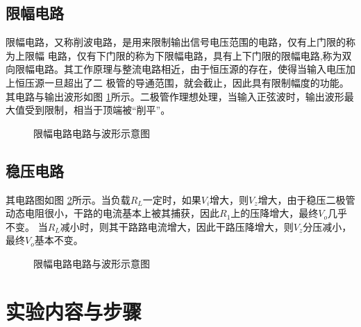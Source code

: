 \documentclass[a4paper,11pt,UTF8]{ctexart}
\begin{document}
	\subsection{限幅电路}
	限幅电路，又称削波电路，是用来限制输出信号电压范围的电路，仅有上门限的称为上限幅
	电路，仅有下门限的称为下限幅电路，具有上下门限的限幅电路,称为双向限幅电路。其工作原理与整流电路相近，由于恒压源的存在，使得当输入电压加上恒压源一旦超出了二
	极管的导通范围，就会截止，因此具有限制幅度的功能。其电路与输出波形如图 \ref{fig:limiter}所示。二极管作理想处理，当输入正弦波时，输出波形最大值受到限制，相当于顶端被“削平”。
	\begin{figure}[htbp]
		\centering
		\caption{限幅电路电路与波形示意图}
		\label{fig:limiter}
	\end{figure}
	
	\subsection{稳压电路}
	其电路图如图 \ref{fig:stabler}所示。当负载$R_L$一定时，如果$V_i$增大，则$V_z$增大，由于稳压二极管动态电阻很小，干路的电流基本上被其捕获，因此$R_1$上的压降增大，最终$V_o$几乎不变。
	当$R_L$减小时，则其干路路电流增大，因此干路压降增大，则$V_z$分压减小，最终$V_o$基本不变。
	\begin{figure}[htbp]
		\centering
		\caption{限幅电路电路与波形示意图}
		\label{fig:stabler}
	\end{figure}
	
	
	\section{实验内容与步骤}
\end{document}
